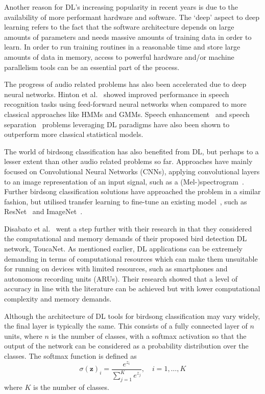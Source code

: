 Another reason for DL's increasing popularity in recent years is due
to the availability of more performant hardware and software. The `deep' aspect
to deep learning refers to the fact that the software architecture depends on
large amounts of parameters and needs massive amounts of training data in order
to learn. In order to run training routines in a reasonable time and store large
amounts of data in memory, access to powerful hardware and/or machine
parallelism tools can be an essential part of the process.

The progress of audio related problems has also been accelerated due to deep
neural networks. Hinton et al.~\cite{hinton2012deep} showed improved performance
in speech recognition tasks using feed-forward neural networks when compared to
more classical approaches like HMMs and GMMs. Speech
enhancement~\cite{afouras2018conversation} and speech
separation~\cite{ephrat2018looking} problems leveraging DL paradigms
have also been shown to outperform more classical statistical models.

The world of birdsong classification has also benefited from DL, but perhaps to
a lesser extent than other audio related problems so far. Approaches have mainly
focused on Convolutional Neural Networks (CNNs), applying convolutional layers
to an image representation of an input signal, such as a
(Mel-)spectrogram~\cite{berger2018bird,mukherjee2018convolutional}. Further
birdsong classification solutions have approached the problem in a similar
fashion, but utilised transfer learning to fine-tune an existing
model~\cite{disabato2021birdsong,lasseck2018acoustic}, such as
ResNet~\cite{he2016deep} and ImageNet~\cite{deng2009imagenet}.

Disabato et al.~\cite{disabato2021birdsong} went a step further with their
research in that they considered the computational and memory demands of their
proposed bird detection DL network, ToucaNet. As mentioned earlier, DL
applications can be extremely demanding in terms of computational resources
which can make them unsuitable for running on devices with limited resources,
such as smartphones and autonomous recording units (ARUs). Their research showed
that a level of accuracy in line with the literature can be achieved but with
lower computational complexity and memory demands.

Although the architecture of DL tools for birdsong classification may vary
widely, the final layer is typically the same. This consists of a fully
connected layer of $n$ units, where $n$ is the number of classes, with a softmax
activation so that the output of the network can be considered as a probability
distribution over the classes. The softmax function is defined as
\begin{equation}
\sigma{(\mathbf{z})}_i = \frac{e^{z_i}}
  {\sum_{j=1}^{K} e^{z_j}}, \hspace{1em} i = 1,\ldots,K
\end{equation}
where $K$ is the number of classes.

